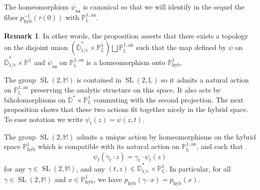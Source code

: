 \documentclass[10pt]{amsart}
\theoremstyle{definition}\newtheorem{defi}[theo]{Definition}\newtheorem{rema}[theo]{Remark}\newtheorem{exam}[theo]{Example}\newtheorem{exem}[theo]{Example}\newtheorem{nota}[theo]{Notation}
\DeclareMathOperator{\hyb}{hyb}
\DeclareMathOperator{\SL}{SL}
\newcommand{\cc}{\mathbb{C}}
\newcommand{\phyb}{{\mathbb{P}^1_{\mathrm{hyb}}}}
\newcommand{\mm}{\mathbb{M}}
\newcommand{\D}{\mathbb{D}}
\newcommand{\an}{\mathrm{an}}
\newcommand{\PP}{\mathbb{P}}
\newcommand{\Laurent}{\mathbb{L}}
\newcommand{\lrpar}[1]{\left(#1\right)}
\newcommand{\na}{\mathsf{na}}
\newcommand{\inv}{^{-1}}
\begin{document}
The homeomorphism $\psi_\na$ is canonical so that we will identify in the sequel the fiber $p_{\hyb}\inv(\tau(0))$ with $\PP^{1,\an}_{\Laurent}$.

\begin{rema}
In other words, the proposition asserts that there exists a topology on the disjoint union $\lrpar{\overline{\D}^*_{1/e} \times \PP^1_\cc } \bigsqcup \PP^{1,\an}_{\Laurent}$ such that the map defined by $\psi$ on $\overline{\D}^*_{1/e} \times \PP^1 $ and $\psi_\na$ on $\PP^{1,\an}_{\Laurent}$ is a homeomorphism onto $\phyb$.
\end{rema}

The group $\SL(2,\mm)$ is contained in $\SL(2,\Laurent)$ so it admits a natural action on $\PP^{1,\an}_{\Laurent}$ preserving the analytic structure on this space. It also acts by biholomorphisms on $ \D^*\times \PP^1_\cc $ commuting with the second projection. The next proposition shows that these two actions fit together nicely in the hybrid space. To ease notation we write $\psi_t(z) = \psi(z,t)$.

\begin{prop}\label{prop:action hybrid}
The group $\SL(2,\mm)$ admits a unique action by homeomorphisms on the hybrid space $\PP^1_{\hyb}$ which is compatible with its natural action on $\PP^{1,\an}_{\Laurent}$, and such that
\begin{equation}\label{eq:321}
\psi_t (\gamma_t \cdot z) = \gamma_t \cdot \psi_t(z)
\end{equation}
for any $\gamma\in \SL(2,\mm)$, and any $(t,z)\in \overline{\D}^*_{1/e} \times\PP^1_\cc $. In particular, for all $\gamma\in \SL(2,\mm)$ and $x\in \phyb$, we have $p_{\hyb} (\gamma \cdot x) = p_{\hyb} (x)$.
\end{prop}
\end{document}
